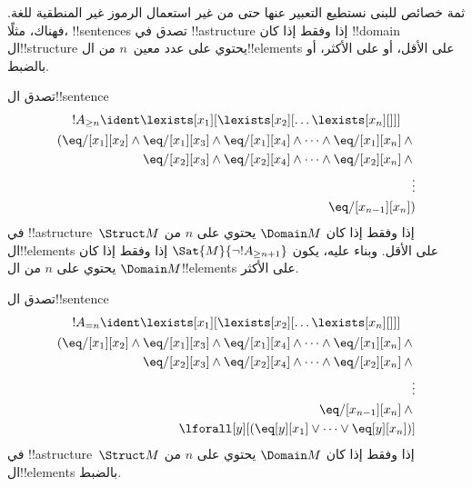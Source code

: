\documentclass[../../../include/open-logic-section]{subfiles}
\begin{document}


\begin{explain}
ثمة خصائص للبنى نستطيع التعبير عنها حتى من غير استعمال الرموز غير
المنطقية للغة. فهناك، مثلًا، !!{sentence}s تصدق في !!a{structure}
إذا وفقط إذا كان !!{domain} ال!!{structure} يحتوي على عدد معين~$n$
من ال!!{element}s على الأقل، أو على الأكثر، أو بالضبط.
\end{explain}

\begin{prop}
تصدق ال!!{sentence}
\begin{multline*}
  !A_{\ge n} \ident \lexists[x_1][\lexists[x_2][\dots\lexists[x_n][{}]]]\\
  \begin{aligned}
  (\eq/[x_1][x_2] \land {}
  \eq/[x_1][x_3] \land \eq/[x_1][x_4] \land \dots \land \eq/[x_1][x_n] \land {}\\
\eq/[x_2][x_3] \land \eq/[x_2][x_4] \land \dots \land {} \eq/[x_2][x_n] \land {} \\
\vdots\\
\eq/[x_{n-1}][x_n])
\end{aligned}
\end{multline*}
في !!a{structure}~$\Struct M$ إذا وفقط إذا كان $\Domain M$ يحتوي على
$n$ من ال!!{element}s على الأقل. وبناء عليه، يكون
$\Sat{M}{\lnot !A_{\ge n+1}}$ إذا وفقط إذا كان $\Domain M$ يحتوي على
$n$ من ال!!{element}s على الأكثر.

\end{prop}

\begin{prop}
تصدق ال!!{sentence}
\begin{multline*}
!A_{= n} \ident \lexists[x_1][\lexists[x_2][\dots\lexists[x_n][{}]]] \\
\begin{aligned}
  (\eq/[x_1][x_2] \land {}
  \eq/[x_1][x_3] \land \eq/[x_1][x_4] \land \dots \land \eq/[x_1][x_n] \land {}\\
\eq/[x_2][x_3] \land \eq/[x_2][x_4] \land \dots \land {} \eq/[x_2][x_n] \land {} \\
\vdots\\
\eq/[x_{n-1}][x_n] \land {} \\
\lforall[y][(\eq[y][x_1] \lor \dots \lor \eq[y][x_n])]
\end{aligned}
\end{multline*}
في !!a{structure}~$\Struct M$ إذا وفقط إذا كان $\Domain M$ يحتوي على
$n$ من ال!!{element}s بالضبط.
\end{prop}
\end{document}
